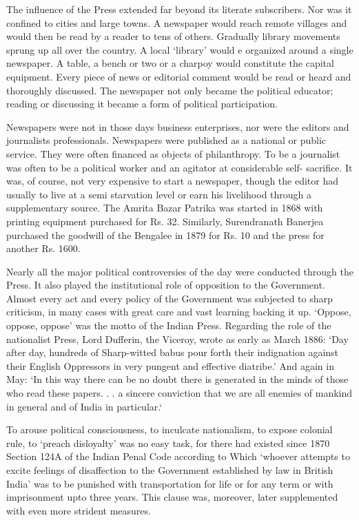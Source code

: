 The influence of the Press extended far beyond its literate subscribers. Nor was it confined to cities and large towns. A newspaper would reach remote villages and would then be read by a reader to tens of others. Gradually library movements sprung up all over the country. A local ‘library’ would e organized around a single newspaper. A table, a bench or two or a charpoy would constitute the capital equipment. Every piece of news or editorial comment would be read or heard and thoroughly discussed. The newspaper not only became the political educator; reading or discussing it became a form of political participation.

Newspapers were not in those days business enterprises, nor were the editors and journalists professionals. Newspapers were published as a national or public service. They were often financed as objects of philanthropy. To be a journalist was often to be a political worker and an agitator at considerable self- sacrifice. It was, of course, not very expensive to start a newspaper, though the editor had usually to live at a semi starvation level or earn his livelihood through a supplementary source. The Amrita Bazar Patrika was started in 1868 with printing equipment purchased for Rs. 32. Similarly, Surendranath Banerjea purchased the goodwill of the Bengalee in 1879 for Rs. 10 and the press for another Rs. 1600.

Nearly all the major political controversies of the day were conducted through the Press. It also played the institutional role of opposition to the Government. Almost every act and every policy of the Government was subjected to sharp criticism, in many cases with great care and vast learning backing it up. ‘Oppose, oppose, oppose’ was the motto of the Indian Press. Regarding the role of the nationalist Press, Lord Dufferin, the Viceroy, wrote as early as March 1886: ‘Day after day, hundreds of Sharp-witted babus pour forth their indignation against their English Oppressors in very pungent and effective diatribe.’ And again in May: ‘In this way there can be no doubt there is generated in the minds of those who read these papers. . . a sincere conviction that we are all enemies of mankind in general and of India in particular.‘

To arouse political consciousness, to inculcate nationalism, to expose colonial rule, to ‘preach disloyalty’ was no easy task, for there had existed since 1870 Section 124A of the Indian Penal Code according to Which ‘whoever attempts to excite feelings of disaffection to the Government established by law in British India’ was to be punished with transportation for life or for any term or with imprisonment upto three years. This clause was, moreover, later supplemented with even more strident measures.

